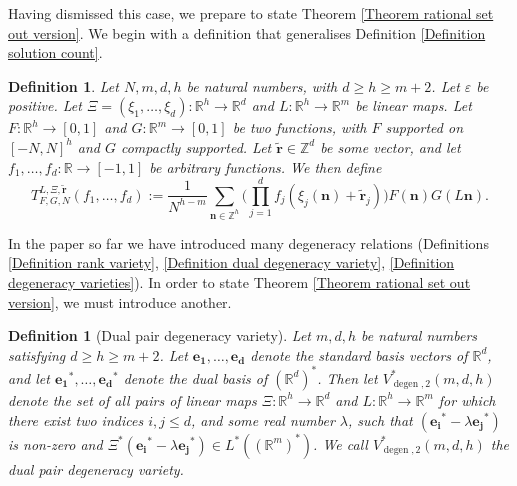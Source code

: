 \documentclass[12pt,a4paper,twoside,reqno]{amsart}
\newtheorem{Definition}[Theorem]{Definition}
\newcommand{\degen}{\operatorname{degen}}
\numberwithin{equation}{section}
\begin{document}
Having dismissed this case, we prepare to state Theorem \ref{Theorem rational set out version}. We begin with a definition that generalises Definition \ref{Definition solution count}.
\begin{Definition}
\label{Definition solution count rational separation}
Let $N,m,d,h$ be natural numbers, with $d\geqslant h\geqslant m+2$. Let $\varepsilon$ be positive. Let $\Xi = (\xi_1,\dots,\xi_d) :\mathbb{R}^h\longrightarrow \mathbb{R}^d$ and $L:\mathbb{R}^{h}\longrightarrow \mathbb{R}^m$ be linear maps. Let $F:\mathbb{R}^{h}\rightarrow [0,1]$ and $G:\mathbb{R}^m\rightarrow [0,1]$ be two functions, with $F$ supported on $[-N,N]^h$ and $G$ compactly supported. Let $\widetilde{\mathbf{r}} \in \mathbb{Z}^d$ be some vector, and let $f_1,\dots,f_{d}:\mathbb{R}\longrightarrow [-1,1]$ be arbitrary functions. We then define
\begin{equation}
\label{equation solution count rational separation}
T^{L,\Xi,\widetilde{\mathbf{r}}}_{F,G,N}(f_1,\dots,f_{d}) := \frac{1}{N^{h-m}}\sum\limits_{\mathbf{n} \in \mathbb{Z}^h}\Big(\prod\limits_{j=1}^{d}f_j(\xi_j(\mathbf{n})+ \widetilde{\mathbf{r}}_j)\Big)F(\mathbf{n})G(L\mathbf{n}).
\end{equation}
\end{Definition}

In the paper so far we have introduced many degeneracy relations (Definitions \ref{Definition rank variety}, \ref{Definition dual degeneracy variety}, \ref{Definition degeneracy varieties}). In order to state Theorem \ref{Theorem rational set out version}, we must introduce another. 

\begin{Definition}[Dual pair degeneracy variety]
\label{Definition dual pair degeneracy variety}
Let $m,d,h$ be natural numbers satisfying $d\geqslant h\geqslant m+2$. Let $\mathbf{e_1}, \dots,\mathbf{e_d}$ denote the standard basis vectors of $\mathbb{R}^d$, and let $\mathbf{e_1}^\ast, \dots,\mathbf{e_d}^\ast$ denote the dual basis of $(\mathbb{R}^d)^\ast$. Then let $V^*_{\degen,2}(m,d,h)$ denote the set of all pairs of linear maps $\Xi:\mathbb{R}^h \longrightarrow \mathbb{R}^d$ and $L:\mathbb{R}^h \longrightarrow \mathbb{R}^m$ for which there exist two indices $i,j \leqslant d$, and some real number $\lambda$, such that $(\mathbf{e_i}^* - \lambda \mathbf{e_j}^*)$ is non-zero and $\Xi^*(\mathbf{e_i}^* - \lambda \mathbf{e_j}^*) \in L^*((\mathbb{R}^m)^*)$. We call $V^*_{\degen,2}(m,d,h)$ the \emph{dual pair degeneracy variety}. 
\end{Definition}
\end{document}
